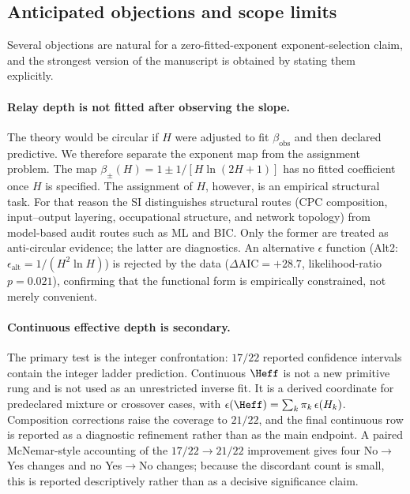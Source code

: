 \subsection{Anticipated objections and scope limits}\label{subsec:anticipated_objections}

Several objections are natural for a zero-fitted-exponent exponent-selection claim,
and the strongest version of the manuscript is obtained by stating them
explicitly.

\paragraph{Relay depth is not fitted after observing the slope.}
The theory would be circular if \(H\) were adjusted to fit
\(\beta_{\mathrm{obs}}\) and then declared predictive.  We therefore separate
the exponent map from the assignment problem.  The map
\(\beta_{\pm}(H)=1\pm 1/[H\ln(2H+1)]\) has no fitted coefficient once \(H\) is
specified.  The assignment of \(H\), however, is an empirical structural task.
For that reason the SI distinguishes structural routes (CPC composition,
input--output layering, occupational structure, and network topology) from
model-based audit routes such as ML and BIC.  Only the former are treated as
anti-circular evidence; the latter are diagnostics.  An alternative
\(\epsilon\) function (Alt2: \(\epsilon_{\mathrm{alt}}=1/(H^{2}\ln H)\)) is
rejected by the data (\(\Delta\mathrm{AIC}=+28.7\), likelihood-ratio
\(p=0.021\)), confirming that the functional form is empirically constrained,
not merely convenient.

\paragraph{Continuous effective depth is secondary.}
The primary test is the integer confrontation: \(17/22\) reported confidence
intervals contain the integer ladder prediction.  Continuous \(\Heff\) is not a
new primitive rung and is not used as an unrestricted inverse fit.  It is a
derived coordinate for predeclared mixture or crossover cases, with
\(\epsilon(\Heff)=\sum_k\pi_k\,\epsilon(H_k)\).  Composition corrections raise
the coverage to \(21/22\), and the final continuous row is reported as a
diagnostic refinement rather than as the main endpoint.  A paired
McNemar-style accounting of the \(17/22\to 21/22\) improvement gives four
No\(\to\)Yes changes and no Yes\(\to\)No changes; because the discordant count
is small, this is reported descriptively rather than as a decisive
significance claim.

